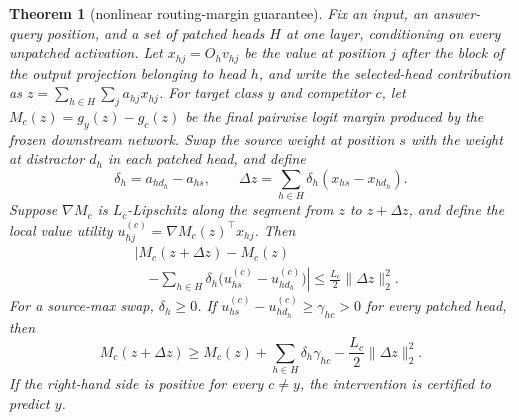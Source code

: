 \documentclass[letterpaper]{article} %
\newtheorem{theorem}[proposition]{Theorem}
\begin{document}
\begin{theorem}[nonlinear routing-margin guarantee]
\label{thm:nonlinear-margin}
Fix an input, an answer-query position, and a set of patched heads $H$ at one layer, conditioning on every
unpatched activation.
Let $x_{hj}=O_hv_{hj}$ be the value at position $j$ after the block of the output projection belonging to
head $h$, and write the selected-head contribution as
$z=\sum_{h\in H}\sum_j a_{hj}x_{hj}$.
For target class $y$ and competitor $c$, let
$M_c(z)=g_y(z)-g_c(z)$ be the final pairwise logit margin produced by the frozen downstream network.
Swap the source weight at position $s$ with the weight at distractor $d_h$ in each patched head, and define
\begin{equation}
\delta_h=a_{h d_h}-a_{h s},
\qquad
\Delta z=\sum_{h\in H}\delta_h(x_{hs}-x_{h d_h}).
\end{equation}
Suppose $\nabla M_c$ is $L_c$-Lipschitz along the segment from $z$ to $z+\Delta z$, and define the local
value utility $u_{hj}^{(c)}=\nabla M_c(z)^\top x_{hj}$.
Then
\begin{equation}
\begin{aligned}
&\left|M_c(z+\Delta z)-M_c(z)\right.\\
&\quad\left.-\sum_{h\in H}\delta_h
\big(u_{hs}^{(c)}-u_{h d_h}^{(c)}\big)\right|
\le \frac{L_c}{2}\lVert\Delta z\rVert_2^2.
\end{aligned}
\label{eq:nonlinear-margin-bound}
\end{equation}
For a source-max swap, $\delta_h\ge0$.
If $u_{hs}^{(c)}-u_{h d_h}^{(c)}\ge\gamma_{hc}>0$ for every patched head, then
\begin{equation}
M_c(z+\Delta z)
\ge M_c(z)+\sum_{h\in H}\delta_h\gamma_{hc}
-\frac{L_c}{2}\lVert\Delta z\rVert_2^2.
\label{eq:certified-margin}
\end{equation}
If the right-hand side is positive for every $c\ne y$, the intervention is certified to predict $y$.
\end{theorem}
\end{document}
